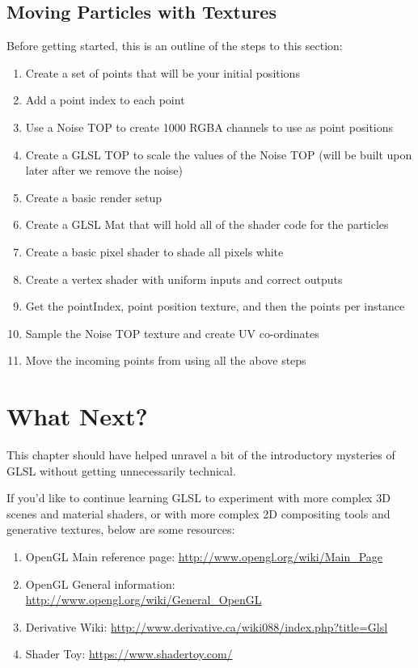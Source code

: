 \subsection{Moving Particles with Textures}
\begin{fullwidth}
Before getting started, this is an outline of the steps to this section:
\begin{enumerate}
\item Create a set of points that will be your initial positions
\item Add a point index to each point
\item Use a Noise TOP to create 1000 RGBA channels to use as point positions
\item Create a GLSL TOP to scale the values of the Noise TOP (will be built upon later after we remove the noise)
\item Create a basic render setup
\item Create a GLSL Mat that will hold all of the shader code for the particles
\item Create a basic pixel shader to shade all pixels white
\item Create a vertex shader with uniform inputs and correct outputs
\item Get the pointIndex, point position texture, and then the points per instance
\item Sample the Noise TOP texture and create UV co-ordinates
\item Move the incoming points from using all the above steps
\end{enumerate}
\end{fullwidth}







\section{What Next?}
\begin{fullwidth}
This chapter should have helped unravel a bit of the introductory mysteries of GLSL without getting unnecessarily technical.

If you'd like to continue learning GLSL to experiment with more complex 3D scenes and material shaders, or with more complex 2D compositing tools and generative textures, below are some resources:

\begin{enumerate}
\item OpenGL Main reference page: \url{http://www.opengl.org/wiki/Main_Page}
\item OpenGL General information: \url{http://www.opengl.org/wiki/General_OpenGL}
\item Derivative Wiki: \url{http://www.derivative.ca/wiki088/index.php?title=Glsl}
\item Shader Toy: \url{https://www.shadertoy.com/}
\end{enumerate}
\end{fullwidth}
